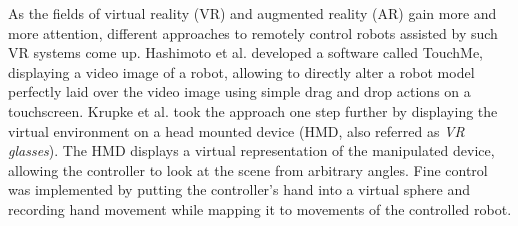 As the fields of virtual reality (VR) and augmented reality (AR) gain more and more attention, different approaches to remotely control robots assisted by such VR systems come up. Hashimoto et al. developed a software called TouchMe, displaying a video image of a robot, allowing to directly alter a robot model perfectly laid over the video image using simple drag and drop actions on a touchscreen\cite{Hashimoto2013}. Krupke et al. took the approach one step further by displaying the virtual environment on a head mounted device (HMD, also referred as \textit{VR glasses}). The HMD displays a virtual representation of the manipulated device, allowing the controller to look at the scene from arbitrary angles. Fine control was implemented by putting the controller's hand into a virtual sphere and recording hand movement while mapping it to movements of the controlled robot.
